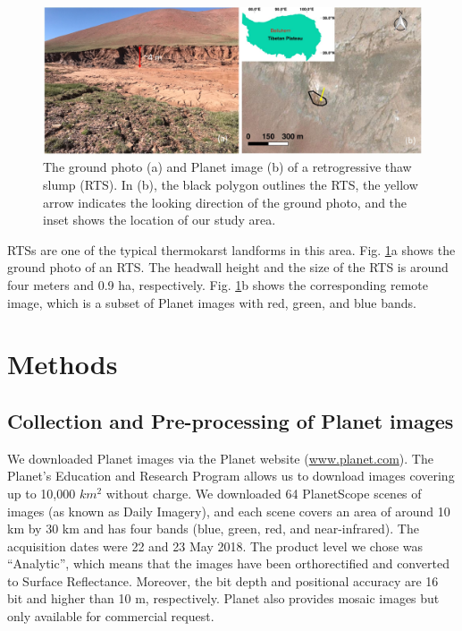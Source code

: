 \documentclass[preprint,12pt,authoryear]{elsarticle}
\begin{document}
\begin{figure}[ht]
	\centering
	\includegraphics[width=14cm]{figures/study_area_loc_RTS_photo_trim.jpg}
	\caption{The ground photo (a) and Planet image (b) of a retrogressive thaw slump (RTS). In (b), the black polygon outlines the RTS, the yellow arrow indicates the looking direction of the ground photo, and the inset shows the location of our study area.}
	\label{fig_rts_groundphoto}
\end{figure}

RTSs are one of the typical thermokarst landforms in this area. Fig. \ref{fig_rts_groundphoto}a shows the ground photo of an RTS. The headwall height and the size of the RTS is around four meters and 0.9 ha, respectively. Fig. \ref{fig_rts_groundphoto}b shows the corresponding remote  image, which is a subset of Planet images with red, green, and blue bands. 

\section{Methods}
\label{sec_meth}

\subsection{Collection and Pre-processing of Planet images}
\label{subsec_collect_images}

We downloaded Planet images via the Planet website (\url{www.planet.com}). The Planet’s Education and Research Program allows us to download images covering up to 10,000 $km^2$ without charge. We downloaded 64 PlanetScope scenes of images (as known as Daily Imagery), and each scene covers an area of around 10 km by 30 km and has four bands (blue, green, red, and near-infrared).  The acquisition dates were 22 and 23 May 2018. The product level we chose was “Analytic”, which means that the images have been orthorectified and converted to Surface Reflectance. Moreover, the bit depth and positional accuracy are 16 bit and higher than 10 m, respectively. Planet also provides mosaic images but only available for commercial request. 
\end{document}
